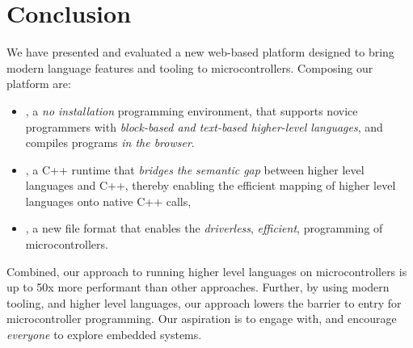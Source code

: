 \section{Conclusion}
\label{sec:conclude}

We have presented and evaluated a new web-based platform designed to bring modern language features and tooling to microcontrollers. Composing our platform are:

\begin{itemize}

\item \MCN, a \emph{no installation} programming environment, that supports novice programmers with \emph{block-based and text-based higher-level languages}, and compiles programs \emph{in the browser}.

\item \CON, a C++ runtime that \emph{bridges the semantic gap} between higher level languages and C++, thereby enabling the efficient mapping of higher level languages onto native C++ calls,

\item \UFN, a new file format that enables the \emph{driverless}, \emph{efficient}, programming of microcontrollers.

\end{itemize}

Combined, our approach to running higher level languages on microcontrollers is up to 50x more performant than other approaches. Further, by using modern tooling, and higher level languages, our approach lowers the barrier to entry for microcontroller programming. Our aspiration is to engage with, and encourage \emph{everyone} to explore embedded systems.
